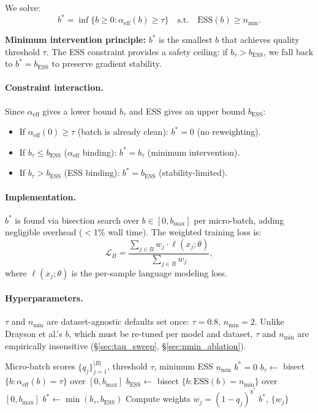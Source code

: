 \documentclass[11pt,a4paper]{article}
\newcommand{\bstar}{b^{*}}
\newcommand{\aeff}{\alpha_{\mathrm{eff}}}
\newcommand{\nmin}{n_{\min}}
\newcommand{\bESS}{b_{\mathrm{ESS}}}
\newcommand{\btau}{b_{\tau}}
\begin{document}
We solve:
\begin{equation}
    \bstar = \inf\{b \geq 0 : \aeff(b) \geq \tau\} \quad \text{s.t.} \quad \mathrm{ESS}(b) \geq \nmin.
    \label{eq:bstar}
\end{equation}

\textbf{Minimum intervention principle:} $\bstar$ is the smallest $b$ that achieves quality threshold $\tau$.
The ESS constraint provides a safety ceiling: if $\btau > \bESS$, we fall back to $\bstar = \bESS$ to preserve gradient stability.

\paragraph{Constraint interaction.}
Since $\aeff$ gives a lower bound $\btau$ and ESS gives an upper bound $\bESS$:
\begin{itemize}
    \item If $\aeff(0) \geq \tau$ (batch is already clean): $\bstar = 0$ (no reweighting).
    \item If $\btau \leq \bESS$ ($\aeff$ binding): $\bstar = \btau$ (minimum intervention).
    \item If $\btau > \bESS$ (ESS binding): $\bstar = \bESS$ (stability-limited).
\end{itemize}

\paragraph{Implementation.}
$\bstar$ is found via bisection search over $b \in [0, b_{\max}]$ per micro-batch, adding negligible overhead ($<$1\% wall time).
The weighted training loss is:
\begin{equation}
    \mathcal{L}_B = \frac{\sum_{j \in B} w_j \cdot \ell(x_j; \theta)}{\sum_{j \in B} w_j},
\end{equation}
where $\ell(x_j; \theta)$ is the per-sample language modeling loss.

\paragraph{Hyperparameters.}
$\tau$ and $\nmin$ are dataset-agnostic defaults set once: $\tau = 0.8$, $\nmin = 2$.
Unlike Drayson et al.'s $b$, which must be re-tuned per model and dataset, $\tau$ and $\nmin$ are empirically insensitive (\S\ref{sec:tau_sweep}, \S\ref{sec:nmin_ablation}).


\begin{algorithm}[t]
\caption{Per-batch adaptive $\bstar$ selection}
\label{alg:bstar}
\begin{algorithmic}[1]
\Require Micro-batch scores $\{q_j\}_{j=1}^{|B|}$, threshold $\tau$, minimum ESS $\nmin$
\If{$\aeff(0) \geq \tau$} 
    \State \Return $\bstar = 0$
\EndIf
\State $\btau \gets$ bisect $\{b : \aeff(b) = \tau\}$ over $[0, b_{\max}]$
\State $\bESS \gets$ bisect $\{b : \mathrm{ESS}(b) = \nmin\}$ over $[0, b_{\max}]$
\State $\bstar \gets \min(\btau, \bESS)$
\State Compute weights $w_j = (1 - q_j)^{\bstar}$
\State \Return $\bstar$, $\{w_j\}$
\end{algorithmic}
\end{algorithm}
\end{document}
